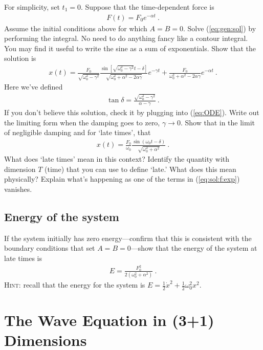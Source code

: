 \documentclass[12pt]{article}
\numberwithin{equation}{section}    %
\begin{document}
For simplicity, set $t_1 = 0$. Suppose that the time-dependent force is
\begin{align}
	F(t) = F_0 e^{-\alpha t} \ .
\end{align}
Assume the initial conditions above for which $A=B=0$. Solve (\ref{eq:gen:sol}) by performing the integral. No need to do anything fancy like a contour integral. You may find it useful to write the sine as a sum of exponentials. Show that the solution is
\begin{align}
	x(t) = \frac{F_0}{\sqrt{\omega_0^2 - \gamma^2}}
	\frac{\sin\left[ \sqrt{\omega_0^2 - \gamma^2} t - \delta \right]}{\sqrt{\omega_0^2 +\alpha^2 - 2\alpha \gamma}}
	e^{-\gamma t}
	+
	\frac{F_0}{\omega_0^2 + \alpha^2 - 2\alpha\gamma} e^{-\alpha t} \ .
	\label{eq:sol:f:exp}
\end{align}
Here we've defined
\begin{align}
	\tan \delta = \frac{\sqrt{\omega_0^2 - \gamma^2}}{\alpha - \gamma} \ .
\end{align}
If you don't believe this solution, check it by plugging into (\ref{eq:ODE}). Write out the limiting form when the damping goes to zero, $\gamma \to 0$. Show that in the limit of negligible damping and for `late times', that
\begin{align}
	x(t) = \frac{F_0}{\omega_0}\frac{\sin (\omega_0 t -\delta)}{\sqrt{\omega_0^2 + \alpha^2}} \ .
\end{align}
What does `late times' mean in this context? Identify the quantity with dimension $T$ (time) that you can use to define `late.' What does this mean physically? Explain what's happening as one of the terms in (\ref{eq:sol:f:exp}) vanishes.

\subsection{Energy of the system}

If the system initially has zero energy---confirm that this is consistent with the boundary conditions that set $A=B=0$---show that the energy of the system at late times is
\begin{align}
	E = \frac{F_0^2}{2(\omega_0^2 + \alpha^2)}\ .
\end{align}
\textsc{Hint}: recall that the energy for the system is $E = \frac 12 \dot x^2 + \frac 12 \omega_0^2 x^2$.




\section{The Wave Equation in (3+1) Dimensions}
\label{problem:wave:eq:3d}
\end{document}
